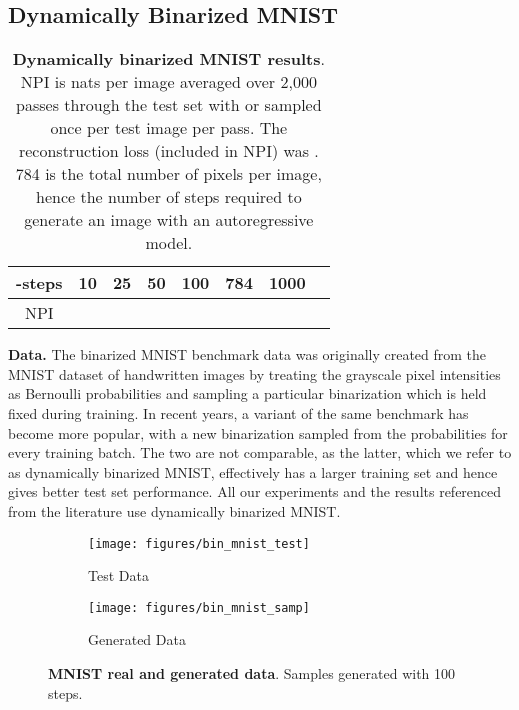 \documentclass[11pt,table]{article}
\newcommand{\0}[1]{\constvec{0}{#1}}
\newcommand{\1}[1]{\constvec{1}{#1}}
\begin{document}
\subsection{Dynamically Binarized MNIST}
\begin{table}[t!]
\centering
\begin{tabular}{cccccccc}
\toprule
-steps & 10 & 25 & 50 & 100 & 784 & 1000 & \\ 
\midrule
NPI &  &  &  &  &  &  &  \\ 
\bottomrule
\end{tabular}
\caption{\textbf{Dynamically binarized MNIST results}. NPI is nats per image  averaged over 2,000 passes through the test set with  or  sampled once per test image per pass. The reconstruction loss  (included in NPI) was . 784 is the total number of pixels per image, hence the number of steps required to generate an image with an autoregressive model.}
\label{tab:mnist_results}
\end{table}

\textbf{Data.}\quad 
The binarized MNIST benchmark data was originally created from the MNIST dataset of handwritten images \citep{lecun-mnisthandwrittendigit-2010} by treating the grayscale pixel intensities as Bernoulli probabilities and sampling a particular binarization \citep{salakhutdinov2008quantitative} which is held fixed during training.
In recent years, a variant of the same benchmark has become more popular, with a new binarization sampled from the probabilities for every training batch.
The two are not comparable, as the latter, which we refer to as dynamically binarized MNIST, effectively has a larger training set and hence gives better test set performance.
All our experiments and the results referenced from the literature use dynamically binarized MNIST.
\\

\begin{figure}[t!]
\centering
\begin{subfigure}{.49\textwidth}
  \centering
  \texttt{[image: figures/bin\_mnist\_test]}
  \caption{Test Data}
\end{subfigure}
\begin{subfigure}{.49\textwidth}
  \centering
  \texttt{[image: figures/bin\_mnist\_samp]}
  \caption{Generated Data}
\end{subfigure}
\caption{\textbf{MNIST real and generated data}. Samples generated with 100 steps.}
\end{figure}
\end{document}
